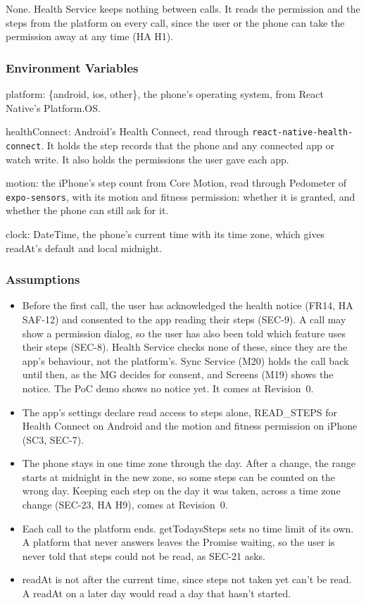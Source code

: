 \documentclass[12pt, titlepage]{article}
\begin{document}
None. Health Service keeps nothing between calls. It reads the permission and
the steps from the platform on every call, since the user or the phone can take
the permission away at any time (HA H1).

\subsubsection{Environment Variables}

\noindent platform: \{android, ios, other\}, the phone's operating system, from
React Native's Platform.OS.

\medskip
\noindent healthConnect: Android's Health Connect, read through
\texttt{react-native-health-connect}. It holds the step records that the
phone and any connected app or watch write. It also holds the permissions the
user gave each app.

\medskip
{\raggedright
\noindent motion: the iPhone's step count from Core Motion, read through
Pedometer of \texttt{expo-sensors}, with its motion and fitness permission:
whether it is granted, and whether the phone can still ask for it.\par}

\medskip
\noindent clock: DateTime, the phone's current time with its time zone, which
gives readAt's default and local midnight.

\subsubsection{Assumptions}

\begin{itemize}
\item Before the first call, the user has acknowledged the health notice (FR14,
  HA SAF-12) and consented to the app reading their steps (SEC-9). A call may
  show a permission dialog, so the user has also been told which feature uses
  their steps (SEC-8). Health Service checks none of these, since they are the
  app's behaviour, not the platform's. Sync Service (M20) holds the call back
  until then, as the MG decides for consent, and Screens (M19) shows the
  notice. The PoC demo shows no notice yet. It comes at Revision~0.
\item The app's settings declare read access to steps alone, READ\_STEPS for
  Health Connect on Android and the motion and fitness permission on iPhone
  (SC3, SEC-7).
\item The phone stays in one time zone through the day. After a change, the
  range starts at midnight in the new zone, so some steps can be counted on the
  wrong day. Keeping each step on the day it was taken, across a time zone
  change (SEC-23, HA H9), comes at Revision~0.
\item Each call to the platform ends. getTodaysSteps sets no time limit of its
  own. A platform that never answers leaves the Promise waiting, so the user is
  never told that steps could not be read, as SEC-21 asks.
\item readAt is not after the current time, since steps not taken yet can't be
  read. A readAt on a later day would read a day that hasn't started.
\end{itemize}
\end{document}
